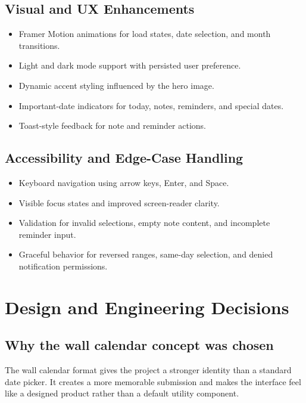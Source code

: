 \documentclass[11pt,a4paper]{article}
\begin{document}
\subsection{Visual and UX Enhancements}

\begin{itemize}[leftmargin=1.4em]
  \item Framer Motion animations for load states, date selection, and month transitions.
  \item Light and dark mode support with persisted user preference.
  \item Dynamic accent styling influenced by the hero image.
  \item Important-date indicators for today, notes, reminders, and special dates.
  \item Toast-style feedback for note and reminder actions.
\end{itemize}

\subsection{Accessibility and Edge-Case Handling}

\begin{itemize}[leftmargin=1.4em]
  \item Keyboard navigation using arrow keys, Enter, and Space.
  \item Visible focus states and improved screen-reader clarity.
  \item Validation for invalid selections, empty note content, and incomplete reminder input.
  \item Graceful behavior for reversed ranges, same-day selection, and denied notification permissions.
\end{itemize}

\section{Design and Engineering Decisions}

\subsection{Why the wall calendar concept was chosen}

The wall calendar format gives the project a stronger identity than a standard date picker.
It creates a more memorable submission and makes the interface feel like a designed product
rather than a default utility component.
\end{document}
